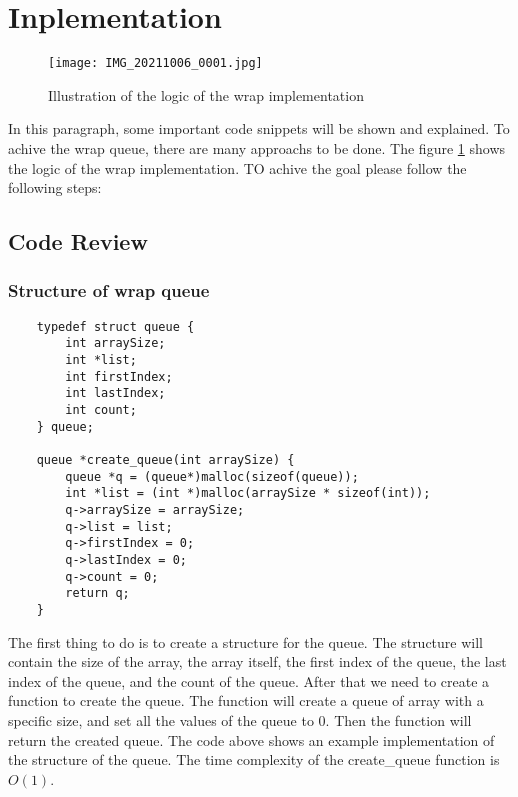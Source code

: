 \section*{Inplementation}
\begin{figure}
    \centering
    \texttt{[image: IMG\_20211006\_0001.jpg]}
    \caption{Illustration of the logic of the wrap implementation}
    \label{fig:wrap_illustration}
\end{figure}

In this paragraph, some important code snippets will be shown and explained.
To achive the wrap queue, there are many approachs to be done. The figure \ref{fig:wrap_illustration} shows the logic of the wrap implementation. TO achive the goal please follow the following steps:


\subsection*{Code Review}
\subsubsection*{Structure of wrap queue}
\begin{verbatim}
    typedef struct queue {
        int arraySize;
        int *list;
        int firstIndex;
        int lastIndex;
        int count;        
    } queue;

    queue *create_queue(int arraySize) {
        queue *q = (queue*)malloc(sizeof(queue));
        int *list = (int *)malloc(arraySize * sizeof(int));
        q->arraySize = arraySize;
        q->list = list;
        q->firstIndex = 0;
        q->lastIndex = 0;
        q->count = 0;
        return q;
    }
\end{verbatim}
The first thing to do is to create a structure for the queue. The structure will contain the size of the array, the array itself, the first index of the queue, the last index of the queue, and the count of the queue. After that we need to create a function to create the queue. The function will create a queue of array with a specific size, and set all the values of the queue to 0. Then the function will return the created queue.
The code above shows an example implementation of the structure of the queue. The time complexity of the create\_queue function is $O(1)$.

